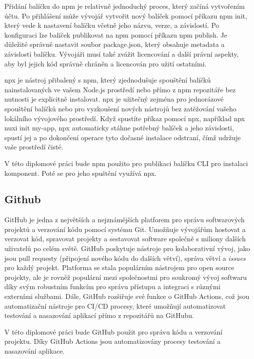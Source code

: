 Přidání balíčku do npm je relativně jednoduchý proces, který začíná vytvořením účtu. Po přihlášení může vývojář vytvořit nový balíček pomocí příkazu npm init, který vede k nastavení balíčku včetně jeho názvu, verze, a závislostí. Po konfiguraci lze balíček publikovat na npm pomocí příkazu npm publish. Je důležité správně nastavit soubor package.json, který obsahuje metadata a závislosti balíčku. Vývojáři musí také zvážit licencování a další právní aspekty, aby byl jejich kód správně chráněn a licencován pro užití ostatními.

npx je nástroj přibalený s npm, který zjednodušuje spouštění balíčků nainstalovaných ve vašem Node.js prostředí nebo přímo z npm repozitáře bez nutnosti je explicitně instalovat. npx je užitečný zejména pro jednorázové spouštění balíčků nebo pro vyzkoušení nových nástrojů bez zatěžování vašeho lokálního vývojového prostředí. Když spustíte příkaz pomocí npx, například npx nuxi init my-app, npx automaticky stáhne potřebný balíček a jeho závislosti, spustí jej a po dokončení operace tyto dočasné instalace odstraní, čímž udržuje vaše prostředí čisté.

V této diplomové práci bude npm použito pro publikaci balíčku CLI pro instalaci komponent. Poté se pro jeho spuštění využívá npx.

\subsection{Github}
GitHub je jedna z největších a nejznámějších platforem pro správu softwarových projektů a verzování kódu pomocí systému Git. Umožňuje vývojářům hostovat a verzovat kód, spravovat projekty a sestavovat software společně s miliony dalších uživatelů po celém světě. GitHub poskytuje nástroje pro kolaborativní vývoj, jako jsou pull requesty (připojení nového kódu do dalších větví), správa větví a \emph{issues} pro každý projekt. Platforma se stala populárním nástrojem pro open source projekty, ale je rovněž populární mezi společnostmi pro soukromý vývoj softwaru díky svým robustním funkcím pro správu přístupu a integraci s různými externími službami. Dále, GitHub rozšiřuje své funkce o GitHub Actions, což jsou automatizační nástroje pro CI/CD procesy, které umožňují automatizovat testování a nasazování aplikací přímo z repozitářů na GitHubu. \cite{Github}

V této diplomové práci bude GitHub použit pro správu kódu a verzování projektu. Díky GitHub Actions jsou automatizovány procesy testování a nasazování aplikace.


